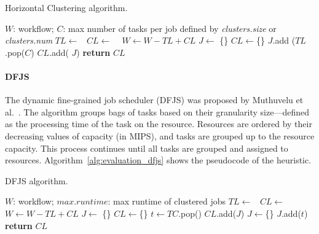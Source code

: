 \begin{algorithm}[!htb]
	\footnotesize
	\caption{Horizontal Clustering algorithm.}
	\label{alg:evaluation_hc}
	\begin{algorithmic}[1]
		\Require $W$: workflow; $C$: max number of tasks per job defined by \emph{clusters.size} or \emph{clusters.num}
				\State $TL\gets $\  
				\State $CL\gets$  \  
				\State $W \gets W - TL + CL$   
			\EndFor
		\EndProcedure
			\State $J\gets$ \{\}
			\State $CL\gets$\{\}
				\State $J$.add ($TL$.pop($C$) 
				\State  $CL$.add( $J$)
			\EndWhile
			\State \textbf{return} $CL$
		\EndProcedure
	\end{algorithmic}
\end{algorithm}

\paragraph{\textbf{DFJS}}
The dynamic fine-grained job scheduler (DFJS) was proposed by Muthuvelu et al.~\cite{Muthuvelu2005}. The algorithm groups bags of tasks based on their granularity size---defined as the processing time of the task on the resource. Resources are ordered by their decreasing values of capacity (in MIPS), and tasks are grouped up to the resource capacity. This process continues until all tasks are grouped and assigned to resources. Algorithm~\ref{alg:evaluation_dfjs} shows the pseudocode of the heuristic. 
 
\begin{algorithm}[!htb]
	\caption{ DFJS algorithm.}
	\footnotesize
	\label{alg:evaluation_dfjs}
	\begin{algorithmic}[1]
		\Require $W$: workflow; $max.runtime$: max runtime of clustered jobs 
				\State $TL\gets $\  
				\State $CL\gets$  \  
				\State $W \gets W - TL + CL$   
			\EndFor
		\EndProcedure
			\State $J\gets$ \{\}
			\State $CL\gets$\{\}
				\State $t \gets TC$.pop() 
				\State	$CL$.add($J$)
				\State	$J \gets$\{\}
				\EndIf	
				\State $J$.add($t$)
			\EndWhile
			\State \textbf{return} $CL$
		\EndProcedure
	\end{algorithmic}
\end{algorithm}


